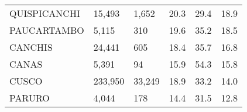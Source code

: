 \begin{tabular}{llllll}
	\cellcolor[HTML]{FF5050}QUISPICANCHI                           & 15,493                                                                & 1,652                                                            & 20.3                                                                             & 29.4                                                                        & 18.9                                                                                \\
	\cellcolor[HTML]{FF5050}PAUCARTAMBO                            & 5,115                                                                 & 310                                                              & 19.6                                                                             & 35.2                                                                        & 18.5                                                                                \\
	\cellcolor[HTML]{FF5050}CANCHIS                                & 24,441                                                                & 605                                                              & 18.4                                                                             & 35.7                                                                        & 16.8                                                                                \\
	\cellcolor[HTML]{FF5050}CANAS                                  & 5,391                                                                 & 94                                                               & 15.9                                                                             & 54.3                                                                        & 15.8                                                                                \\
	\cellcolor[HTML]{F8CBAD}CUSCO                                  & 233,950                                                               & 33,249                                                           & 18.9                                                                             & 33.2                                                                        & 14.0                                                                                \\
	\cellcolor[HTML]{F8CBAD}PARURO                                 & 4,044                                                                 & 178                                                              & 14.4                                                                             & 31.5                                                                        & 12.8                                                                                \\

\end{tabular}
